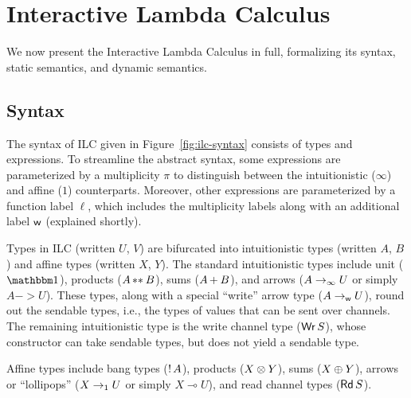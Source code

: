 
%



\section{Interactive Lambda Calculus}
\label{sec:ilc}

We now present the Interactive Lambda Calculus in full, formalizing its syntax,
static semantics, and dynamic semantics.

\subsection{Syntax}
\label{subsec:syntax}

The syntax of ILC given in Figure~\ref{fig:ilc-syntax} consists of types and
expressions. To streamline the abstract syntax, some expressions are
parameterized by a multiplicity $\pi$ to distinguish between the intuitionistic
($\infty$) and affine ($1$) counterparts. Moreover, other expressions are
parameterized by a function label $\ell$, which includes the multiplicity labels
along with an additional label $\textsf{w}$ (explained shortly).

Types in ILC (written $U$, $V$) are bifurcated into intuitionistic types
(written $A$, $B$) and affine types (written $X$, $Y$).  The standard
intuitionistic types include unit ($\tyUnit$), products (${A}\, {**}_{}\, {B}$),
sums (${A}\, {+}_{}\, {B}$), and arrows (${A}\rightarrow_{\infty}{U}$ or simply $A ->
U$). These types, along with a special ``write'' arrow type
(${A}\rightarrow_{\textsf{w}}{U}$), round out the sendable types, i.e., the types of values
that can be sent over channels.  The remaining intuitionistic type is
the write channel type ($\textnormal{\textsf{Wr}}\,S$), whose constructor can take sendable types,
but does not yield a sendable type.

Affine types include bang types (${!}\,{A}$), products (${X}\otimes{Y}$),
sums (${X}\oplus{Y}$), arrows or ``lollipops'' (${X}\rightarrow_{1}{U}$ or simply
$X \multimap U$), and read channel types ($\textnormal{\textsf{Rd}}\,S$).

